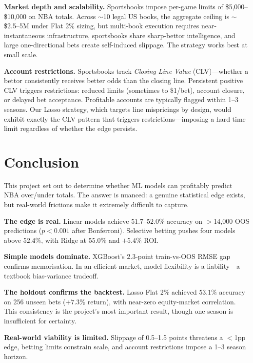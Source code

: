 \documentclass[11pt]{extarticle}
\begin{document}
\textbf{Market depth and scalability.} Sportsbooks impose per-game limits of \$5,000--\$10,000 on NBA totals. Across ${\sim}$10 legal US books, the aggregate ceiling is ${\sim}$\$2.5--5M under Flat 2\% sizing, but multi-book execution requires near-instantaneous infrastructure, sportsbooks share sharp-bettor intelligence, and large one-directional bets create self-induced slippage. The strategy works best at small scale.

\textbf{Account restrictions.} Sportsbooks track \emph{Closing Line Value} (CLV)---whether a bettor consistently receives better odds than the closing line. Persistent positive CLV triggers restrictions: reduced limits (sometimes to \$1/bet), account closure, or delayed bet acceptance. Profitable accounts are typically flagged within 1--3 seasons. Our Lasso strategy, which targets line mispricings by design, would exhibit exactly the CLV pattern that triggers restrictions---imposing a hard time limit regardless of whether the edge persists.

\section{Conclusion}
This project set out to determine whether ML models can profitably predict NBA over/under totals. The answer is nuanced: a genuine statistical edge exists, but real-world frictions make it extremely difficult to capture.

\textbf{The edge is real.} Linear models achieve $51.7$--$52.0\%$ accuracy on $>$14,000 OOS predictions ($p < 0.001$ after Bonferroni). Selective betting pushes four models above $52.4\%$, with Ridge at $55.0\%$ and $+5.4\%$ ROI.

\textbf{Simple models dominate.} XGBoost's 2.3-point train-vs-OOS RMSE gap confirms memorisation. In an efficient market, model flexibility is a liability---a textbook bias-variance tradeoff.

\textbf{The holdout confirms the backtest.} Lasso Flat 2\% achieved $53.1\%$ accuracy on 256 unseen bets ($+7.3\%$ return), with near-zero equity-market correlation. This consistency is the project's most important result, though one season is insufficient for certainty.

\textbf{Real-world viability is limited.} Slippage of 0.5--1.5 points threatens a $<$1pp edge, betting limits constrain scale, and account restrictions impose a 1--3 season horizon.
\end{document}
